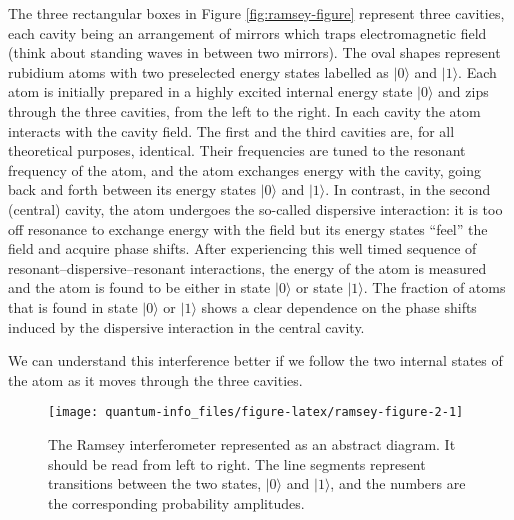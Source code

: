 \documentclass[fleqn]{article}
\begin{document}
The three rectangular boxes in Figure \ref{fig:ramsey-figure} represent three cavities, each cavity being an arrangement of mirrors which traps electromagnetic field (think about standing waves in between two mirrors).
The oval shapes represent rubidium atoms with two preselected energy states labelled as \(|0\rangle\) and \(|1\rangle\).
Each atom is initially prepared in a highly excited internal energy state \(|0\rangle\) and zips through the three cavities, from the left to the right.
In each cavity the atom interacts with the cavity field.
The first and the third cavities are, for all theoretical purposes, identical.
Their frequencies are tuned to the resonant frequency of the atom, and the atom exchanges energy with the cavity, going back and forth between its energy states \(|0\rangle\) and \(|1\rangle\).
In contrast, in the second (central) cavity, the atom undergoes the so-called dispersive interaction: it is too off resonance to exchange energy with the field but its energy states ``feel'' the field and acquire phase shifts.
After experiencing this well timed sequence of resonant--dispersive--resonant interactions, the energy of the atom is measured and the atom is found to be either in state \(|0\rangle\) or state \(|1\rangle\).
The fraction of atoms that is found in state \(|0\rangle\) or \(|1\rangle\) shows a clear dependence on the phase shifts induced by the dispersive interaction in the central cavity.

We can understand this interference better if we follow the two internal states of the atom as it moves through the three cavities.



\begin{figure}[H]

{\centering \texttt{[image: quantum-info\_files/figure-latex/ramsey-figure-2-1]} 

}

\caption{The Ramsey interferometer represented as an abstract diagram. It should be read from left to right. The line segments represent transitions between the two states, \(|0\rangle\) and \(|1\rangle\), and the numbers are the corresponding probability amplitudes.}\label{fig:ramsey-figure-2}
\end{figure}
\end{document}
